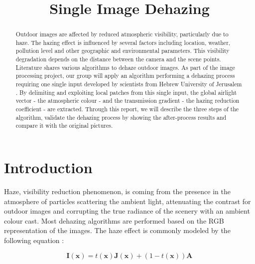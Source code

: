 \documentclass[conference]{IEEEtran}
\begin{document}
\title{Single Image Dehazing}

\author{
\and
{}
\and
{}
}

\maketitle

\begin{abstract}
Outdoor images are affected by reduced atmospheric visibility, particularly due to haze. The hazing effect is influenced by several 
factors including location, weather, pollution level and other geographic and environmental parameters. This visibility degradation depends on the distance between the camera and the scene points. Literature shares various algorithms to dehaze outdoor 
images.  As part of the image processing project, our group will apply an algorithm performing a dehazing process requiring
one single input developed by scientists from Hebrew University of Jerusalem \cite{airlight} \cite{dehaze}. By delimiting and exploiting local patches from this single input, the global airlight vector - the atmospheric
colour - and the transmission gradient - the hazing reduction coefficient - are extracted.  Through this report, we will describe 
the three steps of the algorithm, validate the dehazing process by showing the after-process results and compare it with the 
original pictures.  
\end{abstract}

\section{Introduction}

Haze, visibility reduction phenomenon, is coming from the presence in the atmosphere of particles scattering the ambient 
light, attenuating the contrast for outdoor images and corrupting the true radiance of the scenery with an ambient colour cast.
Most dehazing algorithms are performed based on the RGB representation of the images.
The haze effect is commonly modeled by the following equation \cite{airlight}:

\begin{equation}
\label{image_model}
\mathbf{I}(\mathbf{x}) = t(\mathbf{x}) \mathbf{J}(\mathbf{x}) + (1-t(\mathbf{x})) \mathbf{A}
\end{equation}
\end{document}
